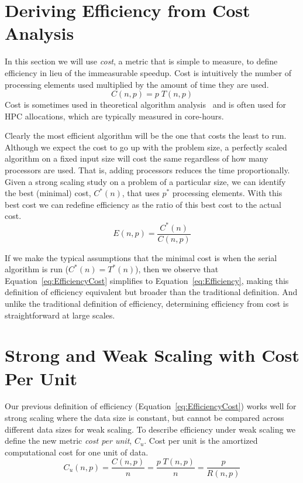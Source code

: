 \documentclass{llncs}
\newcommand*{\lcite}[1]{~\cite{#1}}
\newcommand*{\keyterm}[1]{\emph{#1}}
\begin{document}
\section{Deriving Efficiency from Cost Analysis}
\label{sec:CostAnalysis}

\noindent
In this section we will use \keyterm{cost}, a metric that is simple to
measure, to define efficiency in lieu of the immeasurable speedup. Cost is
intuitively the number of processing elements used multiplied by the amount
of time they are used.
\begin{equation}
  C(n,p) = p \; T(n,p)
  \label{eq:Cost}
\end{equation}
Cost is sometimes used in theoretical algorithm analysis\lcite{JaJa1992}
and is often used for HPC allocations, which are typically measured in
core-hours.

Clearly the most efficient algorithm will be the one that costs the least
to run. Although we expect the cost to go up with the problem size, a
perfectly scaled algorithm on a fixed input size will cost the same
regardless of how many processors are used. That is, adding processors
reduces the time proportionally. Given a strong scaling study on a problem
of a particular size, we can identify the best (minimal) cost, $C^*(n)$,
that uses $p^*$ processing elements. With this best cost we can redefine
efficiency as the ratio of this best cost to the actual cost.
\begin{equation}
  E(n,p) = \frac{C^*(n)}{C(n,p)}
  \label{eq:EfficiencyCost}
\end{equation}

If we make the typical assumptions that the minimal cost is when the serial
algorithm is run ($C^*(n) = T^*(n)$), then we observe that
Equation~\ref{eq:EfficiencyCost} simplifies to
Equation~\ref{eq:Efficiency}, making this definition of efficiency
equivalent but broader than the traditional definition. And unlike the
traditional definition of efficiency, determining efficiency from cost is
straightforward at large scales.


\section{Strong and Weak Scaling with Cost Per Unit}
\label{sec:CostPerUnit}

\noindent
Our previous definition of efficiency (Equation~\ref{eq:EfficiencyCost})
works well for strong scaling where the data size is constant, but cannot
be compared across different data sizes for weak scaling. To describe
efficiency under weak scaling we define the new metric \keyterm{cost per
  unit}, $C_u$. Cost per unit is the amortized computational cost for
one unit of data.
\begin{equation}
  C_u(n,p) = \frac{C(n,p)}{n} = \frac{p \; T(n,p)}{n}
  = \frac{p}{R(n,p)}
  \label{eq:CostPerUnit}
\end{equation}
\end{document}
